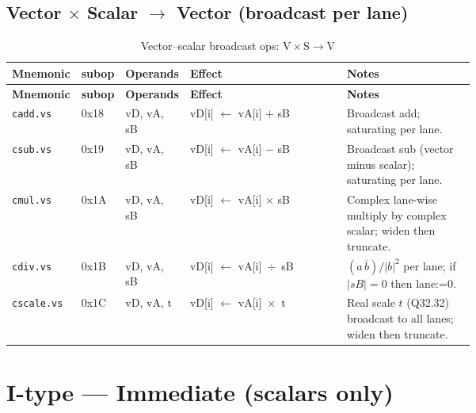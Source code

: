 \documentclass[10pt]{article}
\begin{document}
\subsection*{Vector $\times$ Scalar $\to$ Vector (broadcast per lane)}
\begin{longtable}{@{}l l l L{0.38\linewidth} L{0.30\linewidth}@{}}
\caption{Vector–scalar broadcast ops: $\mathrm{V}\times\mathrm{S} \to \mathrm{V}$}\label{tab:vs_to_v}\\
\toprule
\textbf{Mnemonic} & \textbf{subop} & \textbf{Operands} & \textbf{Effect} & \textbf{Notes} \\
\midrule
\endfirsthead
\toprule
\textbf{Mnemonic} & \textbf{subop} & \textbf{Operands} & \textbf{Effect} & \textbf{Notes} \\
\midrule
\endhead
\texttt{cadd.vs} & 0x18 & vD, vA, sB & vD[i] $\leftarrow$ vA[i] $+$ sB
  & Broadcast add; saturating per lane. \\
\texttt{csub.vs} & 0x19 & vD, vA, sB & vD[i] $\leftarrow$ vA[i] $-$ sB
  & Broadcast sub (vector minus scalar); saturating per lane. \\
\texttt{cmul.vs} & 0x1A & vD, vA, sB & vD[i] $\leftarrow$ vA[i] $\times$ sB
  & Complex lane-wise multiply by complex scalar; widen then truncate. \\
\texttt{cdiv.vs} & 0x1B & vD, vA, sB & vD[i] $\leftarrow$ vA[i] \,$\div$\, sB
  & $(a\,\overline{b})/|b|^2$ per lane; if $|sB|{=}0$ then lane:=0. \\
\texttt{cscale.vs} & 0x1C & vD, vA, t & vD[i] $\leftarrow$ vA[i] \,$\times$\, t
  & Real scale $t$ (Q32.32) broadcast to all lanes; widen then truncate. \\
\bottomrule
\end{longtable}




\section*{I-type — Immediate (scalars only)}
\end{document}
